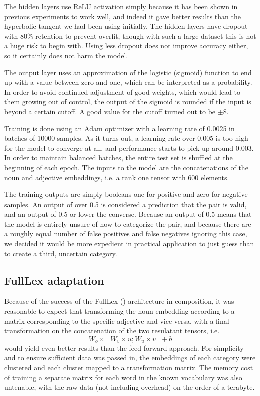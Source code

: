 \documentclass[a4paper, 11pt]{scrartcl}
\begin{document}
The hidden layers use ReLU activation simply because it has been shown in previous experiments to work well, and indeed it gave better results than the hyperbolic tangent we had been using initially. The hidden layers have dropout with 80\% retention to prevent overfit, though with such a large dataset this is not a huge risk to begin with. Using less dropout does not improve accuracy either, so it certainly does not harm the model.

The output layer uses an approximation of the logistic (sigmoid) function to end up with a value between zero and one, which can be interpreted as a probability. In order to avoid continued adjustment of good weights, which would lead to them growing out of control, the output of the sigmoid is rounded if the input is beyond a certain cutoff. A good value for the cutoff turned out to be $ \pm 8 $.

Training is done using an Adam optimizer with a learning rate of 0.0025 in batches of 10000 samples. As it turns out, a learning rate over 0.005 is too high for the model to converge at all, and performance starts to pick up around 0.003. In order to maintain balanced batches, the entire test set is shuffled at the beginning of each epoch. The inputs to the model are the concatenations of the noun and adjective embeddings, i.e. a rank one tensor with 600 elements.

The training outputs are simply booleans \textemdash one for positive and zero for negative samples. An output of over 0.5 is considered a prediction that the pair is valid, and an output of 0.5 or lower the converse. Because an output of 0.5 means that the model is entirely unsure of how to categorize the pair, and because there are a roughly equal number of false positives and false negatives ignoring this case, we decided it would be more expedient in practical application to just guess than to create a third, uncertain category.

\subsection{FullLex adaptation}
Because of the success of the FullLex (\cite{SocherFullLex}) architecture in composition, it was reasonable to expect that transforming the noun embedding according to a matrix corresponding to the specific adjective and vice versa, with a final transformation on the concatenation of the two resulatant tensors, i.e. $$ W_o \times [W_v \times u; W_u \times v] + b $$ would yield even better results than the feed-forward approach. For simplicity and to ensure sufficient data was passed in, the embeddings of each category were clustered and each cluster mapped to a transformation matrix. The memory cost of training a separate matrix for each word in the known vocabulary was also untenable, with the raw data (not including overhead) on the order of a terabyte.
\end{document}
